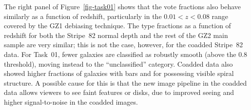 \documentclass[useAMS,usenatbib]{mn2e}
\begin{document}

The right panel of Figure~\ref{fig-task01} shows that the vote fractions also behave similarly as a function of redshift, particularly in the $0.01<z<0.08$ range covered by the GZ1 debiasing technique. The type fractions as a function of redshift for both the Stripe~82 normal depth and the rest of the GZ2 main sample are very similar; this is not the case, however, for the coadded Stripe~82 data. For Task~01, fewer galaxies are classified as robustly smooth (above the 0.8 threshold), moving instead to the ``unclassified'' category. Coadded data also showed higher fractions of galaxies with bars and for possessing visible spiral structure. A possible cause for this is that the new image pipeline in the coadded data allows viewers to see faint features or disks, due to improved seeing \citep[from $1.4\arcsec$ to $1.1\arcsec$;][]{ann11} and higher signal-to-noise in the coadded images.
\end{document}
